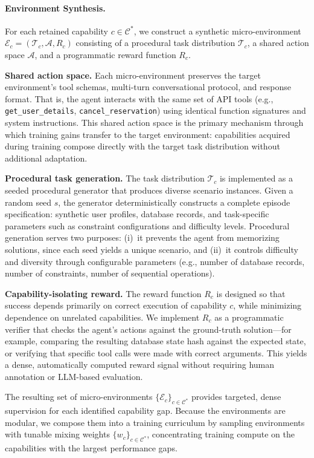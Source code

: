 \paragraph{Environment Synthesis.}
For each retained capability $c \in \mathcal{C}^{*}$, we construct a synthetic
micro-environment $\mathcal{E}_c = (\mathcal{T}_c, \mathcal{A}, R_c)$
consisting of a procedural task distribution $\mathcal{T}_c$, a shared action
space $\mathcal{A}$, and a programmatic reward function $R_c$.

\textbf{Shared action space.}
Each micro-environment preserves the target environment's tool schemas,
multi-turn conversational protocol, and response format. That is, the agent
interacts with the same set of API tools (e.g., \texttt{get\_user\_details},
\texttt{cancel\_reservation}) using identical function signatures and system
instructions. This shared action space is the primary mechanism through which
training gains transfer to the target environment: capabilities acquired during
training compose directly with the target task distribution without additional
adaptation.

\textbf{Procedural task generation.}
The task distribution $\mathcal{T}_c$ is implemented as a seeded procedural
generator that produces diverse scenario instances. Given a random seed $s$,
the generator deterministically constructs a complete episode specification:
synthetic user profiles, database records, and task-specific parameters such as
constraint configurations and difficulty levels. Procedural generation serves
two purposes: (i)~it prevents the agent from memorizing solutions, since each
seed yields a unique scenario, and (ii)~it controls difficulty and diversity
through configurable parameters (e.g., number of database records, number of
constraints, number of sequential operations).

\textbf{Capability-isolating reward.}
The reward function $R_c$ is designed so that success depends primarily on
correct execution of capability $c$, while minimizing dependence on unrelated
capabilities. We implement $R_c$ as a programmatic verifier that checks the
agent's actions against the ground-truth solution---for example, comparing the
resulting database state hash against the expected state, or verifying that
specific tool calls were made with correct arguments. This yields a dense,
automatically computed reward signal without requiring human annotation or
LLM-based evaluation.

The resulting set of micro-environments
$\{\mathcal{E}_c\}_{c \in \mathcal{C}^{*}}$ provides targeted, dense
supervision for each identified capability gap. Because the environments are
modular, we compose them into a training curriculum by sampling environments
with tunable mixing weights $\{w_c\}_{c \in \mathcal{C}^{*}}$, concentrating
training compute on the capabilities with the largest performance gaps.

